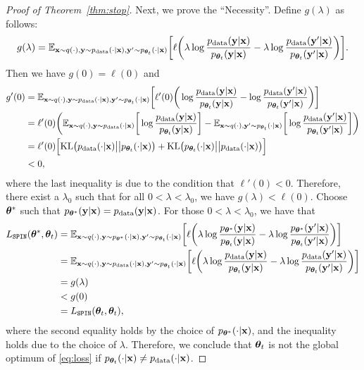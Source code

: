 \documentclass{article}
\newcommand{\method}{\texttt{SPIN}}
\begin{document}
\begin{proof}[Proof of Theorem~\ref{thm:stop}]
Next, we prove the ``Necessity''. Define $g(\lambda)$ as follows: 
\begin{align*}
g(\lambda) = \mathbb{E}_{\mathbf{x} \sim q(\cdot), \mathbf{y} \sim p_{\mathrm{data}}(\cdot|\mathbf{x}), \mathbf{y}' \sim p_{\bm{\theta}_t}(\cdot|\mathbf{x})}\bigg[\ell\bigg(\lambda \log \frac{p_{\mathrm{data}}(\mathbf{y} | \mathbf{x})}{p_{\bm{\theta}_t}(\mathbf{y} | \mathbf{x})}-\lambda \log \frac{p_{\mathrm{data}}(\mathbf{y}' | \mathbf{x})}{p_{\bm{\theta}_t}(\mathbf{y}' | \mathbf{x})}\bigg)\bigg].\label{eq:}   
\end{align*}
Then we have $g(0) = \ell(0)$ and 
\begin{align*}
g'(0) &= \mathbb{E}_{\mathbf{x} \sim q(\cdot), \mathbf{y} \sim p_{\mathrm{data}}(\cdot|\mathbf{x}), \mathbf{y}' \sim p_{\bm{\theta}_t}(\cdot|\mathbf{x})}\bigg[\ell'(0)\bigg(\log \frac{p_{\mathrm{data}}(\mathbf{y} | \mathbf{x})}{p_{\bm{\theta}_t}(\mathbf{y} | \mathbf{x})}-  \log \frac{p_{\mathrm{data}}(\mathbf{y}' | \mathbf{x})}{p_{\bm{\theta}_t}(\mathbf{y}' | \mathbf{x})}\bigg)\bigg]\\
&= \ell'(0) \bigg( \mathbb{E}_{\mathbf{x} \sim q(\cdot), \mathbf{y} \sim p_{\mathrm{data}}(\cdot|\mathbf{x})}\bigg[\log \frac{p_{\mathrm{data}}(\mathbf{y} | \mathbf{x})}{p_{\bm{\theta}_t}(\mathbf{y} | \mathbf{x})}\bigg] - \mathbb{E}_{\mathbf{x} \sim q(\cdot), \mathbf{y}' \sim p_{\bm{\theta}_t}(\cdot|\mathbf{x})}\bigg[\log \frac{p_{\mathrm{data}}(\mathbf{y}' | \mathbf{x})}{p_{\bm{\theta}_t}(\mathbf{y}' | \mathbf{x})}\bigg] \bigg)\\
&= \ell'(0)\Big[\mathrm{KL}\big(p_{\mathrm{data}}(\cdot|\mathbf{x})\big|\big|p_{\bm{\theta}_t}(\cdot|\mathbf{x})\big) + \mathrm{KL}\big(p_{\bm{\theta}_t}(\cdot|\mathbf{x})\big|\big|p_{\mathrm{data}}(\cdot|\mathbf{x})\big)\Big] \\
&< 0,
\end{align*}
where the last inequality is due to the condition that $\ell'(0) < 0$. Therefore, there exist a $\lambda_0$ such that for all $0 < \lambda < \lambda_0$, we have $g(\lambda) < \ell(0)$. Choose $\bm{\theta}^{*}$ such that $p_{\bm{\theta}^{*}}(\mathbf{y}|\mathbf{x}) = p_{\mathrm{data}}(\mathbf{y}|\mathbf{x})$. For those $0 < \lambda < \lambda_0$, we have that 
\begin{align*}
L_{\method}(\btheta^{*}, \btheta_{t}) &= \EE_{\xb \sim q(\cdot), \yb \sim p_{\btheta^{*}}(\cdot|\xb), \yb' \sim p_{\btheta_t}(\cdot|\xb)}\bigg[\ell\bigg(\lambda \log \frac{p_{\btheta^{*}}(\yb | \xb)}{p_{\btheta_t}(\yb | \xb)}-\lambda \log \frac{p_{\btheta^{*}}(\yb' | \xb)}{p_{\btheta_t}(\yb' | \xb)}\bigg)\bigg]\\
&=\EE_{\xb \sim q(\cdot), \yb \sim p_{\mathrm{data}}(\cdot|\xb), \yb' \sim p_{\btheta_t}(\cdot|\xb)}\bigg[\ell\bigg(\lambda \log \frac{p_{\mathrm{data}}(\yb | \xb)}{p_{\btheta_t}(\yb | \xb)}-\lambda \log \frac{p_{\mathrm{data}}(\yb' | \xb)}{p_{\btheta_t}(\yb' | \xb)}\bigg)\bigg]\\
& = g(\lambda) \\
& < g(0)\\
&= L_{\method}(\btheta_{t}, \btheta_{t}),
\end{align*}
where the second equality holds by the choice of $p_{\bm{\theta}^{*}}(\cdot|\mathbf{x})$, and the inequality holds due to the choice of $\lambda$. Therefore, we conclude that $\bm{\theta}_t$ is not the global optimum of \eqref{eq:loss} if $p_{\bm{\theta}_t}(\cdot|\mathbf{x})  \not= p_{\mathrm{data}}(\cdot|\mathbf{x})$.
\end{proof}
\end{document}
